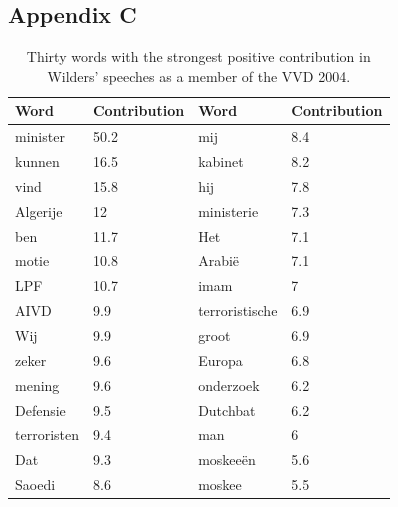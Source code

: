 \documentclass{article}
\begin{document}
\subsection*{Appendix C}
\begin{table}[ht!]
\begin{tabular}{|l|l|l|l|}
\hline
Word        & Contribution & Word           & Contribution \\ \hline
minister    & 50.2         & mij            & 8.4          \\ \hline
kunnen      & 16.5         & kabinet        & 8.2          \\ \hline
vind        & 15.8         & hij            & 7.8          \\ \hline
Algerije    & 12           & ministerie     & 7.3          \\ \hline
ben         & 11.7         & Het            & 7.1          \\ \hline
motie       & 10.8         & Arabië         & 7.1          \\ \hline
LPF         & 10.7         & imam           & 7            \\ \hline
AIVD        & 9.9          & terroristische & 6.9          \\ \hline
Wij         & 9.9          & groot          & 6.9          \\ \hline
zeker       & 9.6          & Europa         & 6.8          \\ \hline
mening      & 9.6          & onderzoek      & 6.2          \\ \hline
Defensie    & 9.5          & Dutchbat       & 6.2          \\ \hline
terroristen & 9.4          & man            & 6            \\ \hline
Dat         & 9.3          & moskeeën       & 5.6          \\ \hline
Saoedi      & 8.6          & moskee         & 5.5          \\ \hline
\end{tabular}
\caption{Thirty words with the strongest positive contribution in Wilders' speeches as a member of the VVD 2004.}
\label{tab:wilders}
\end{table}

\newpage

\printbibliography
\end{document}
